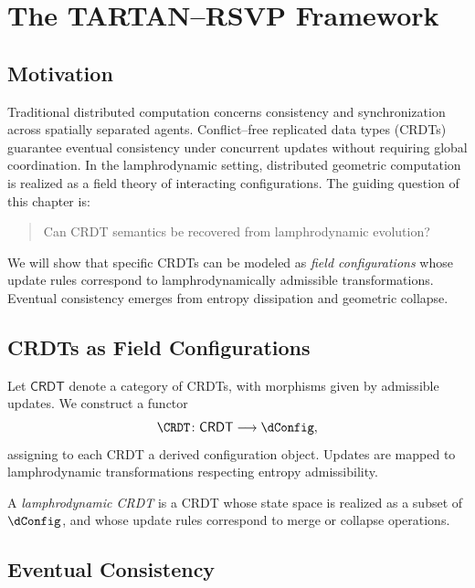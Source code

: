
\chapter{The TARTAN--RSVP Framework}
\label{chap:tartan-rsvp}

\section{Motivation}

Traditional distributed computation concerns consistency and
synchronization across spatially separated agents. Conflict--free
replicated data types (CRDTs) guarantee eventual consistency under
concurrent updates without requiring global coordination. In the
lamphrodynamic setting, distributed geometric computation is realized as
a field theory of interacting configurations. The guiding question of
this chapter is:

\begin{quote}
Can CRDT semantics be recovered from lamphrodynamic evolution?
\end{quote}

We will show that specific CRDTs can be modeled as \emph{field
configurations} whose update rules correspond to lamphrodynamically
admissible transformations. Eventual consistency emerges from entropy
dissipation and geometric collapse.


\section{CRDTs as Field Configurations}

Let $\mathsf{CRDT}$ denote a category of CRDTs, with morphisms given by
admissible updates. We construct a functor
\[
  \CRDT \colon \mathsf{CRDT} \longrightarrow \dConfig,
\]
assigning to each CRDT a derived configuration object. Updates are
mapped to lamphrodynamic transformations respecting entropy admissibility.

\begin{definition}
A \emph{lamphrodynamic CRDT} is a CRDT whose state space is realized as
a subset of $\dConfig$, and whose update rules correspond to merge or
collapse operations.
\end{definition}


\section{Eventual Consistency}

